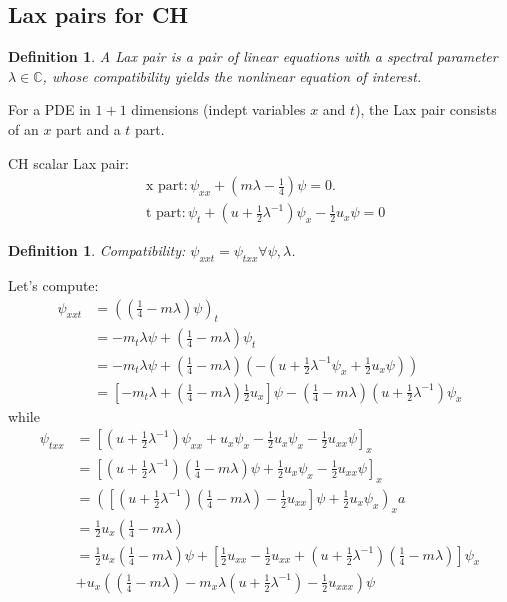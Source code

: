 \documentclass[12pt,reqno]{amsart}
\numberwithin{equation}{section}  %
\newcommand{\cc}{\mathbb{C}}
\newtheorem{definition}[theorem]{Definition}
\begin{document}
\subsection{Lax pairs for CH} 
\label{ssec:lax-pair-CH}
\begin{definition}
    A Lax pair is a pair of linear equations with a spectral parameter $\lambda \in
    \cc$, whose compatibility yields the nonlinear equation of interest. 
\end{definition}
For a PDE in $1+1$ dimensions (indept variables $x$ and $t$), the Lax pair
consists of an $x$ part and a $t$ part.

CH scalar Lax pair:
%
%
\begin{equation*}
    \begin{split}
	& \text{x part}: \psi_{xx} + (m \lambda - \frac{1}{4}) \psi = 0.
	\\
	& \text{t part}: \psi_{t} + (u + \frac{1}{2} \lambda^{-1})\psi_{x} -
	\frac{1}{2}u_{x} \psi = 0
    \end{split}
\end{equation*}
%
%
\begin{definition}
    Compatibility: $\psi_{xxt} = \psi_{txx} \forall \psi, \lambda$. 
\end{definition}
Let's compute:
%
%
\begin{equation*}
    \begin{split}
	\psi_{xxt}
	& = \left( (\frac{1}{4} - m \lambda)\psi \right)_{t}
	\\
	& = -m_{t} \lambda \psi + \left( \frac{1}{4} - m \lambda \right)
	\psi_{t}
	\\
	& = -m_{t} \lambda \psi + \left( \frac{1}{4} - m \lambda \right)\left(
	    -(u + \frac{1}{2} \lambda^{-1}\psi_{x} + \frac{1}{2} u_{x} \psi)
	\right)
	\\
	& = \left[ -m_{t} \lambda + (\frac{1}{4}- m \lambda)\frac{1}{2}u_{x} \right]\psi
	- (\frac{1}{4} - m \lambda)(u + \frac{1}{2}\lambda^{-1})\psi_{x}
    \end{split}
\end{equation*}
%
%
while
%
%
\begin{equation*}
    \begin{split}
	\psi_{txx}
	& = \left[ (u + \frac{1}{2} \lambda^{-1})\psi_{xx} + u_{x}
	    \psi_{x} - \frac{1}{2} u_{x} \psi_{x} - \frac{1}{2} u_{xx} \psi
	\right]_{x}
	\\
	& = \left[ (u + \frac{1}{2}\lambda^{-1})(\frac{1}{4} - m \lambda)\psi
	    + \frac{1}{2} u_{x} \psi_{x} - \frac{1}{2} u_{xx} \psi \right]_{x}
	\\
	& = \left( \left[ (u + \frac{1}{2} \lambda^{-1})(\frac{1}{4} - m \lambda) -
		\frac{1}{2} u_{xx} \right]\psi + \frac{1}{2} u_{x} \psi_{x} \right)_{x}a
	\\
	& = \frac{1}{2} u_{x}(\frac{1}{4} - m \lambda)
	\\
	& = \frac{1}{2}u_{x}\left( \frac{1}{4} - m \lambda \right)\psi + \left[
	    \frac{1}{2}u_{xx} - \frac{1}{2} u_{xx} + (u +
	    \frac{1}{2}\lambda^{-1})(\frac{1}{4} - m \lambda)
	\right]\psi_{x}
	\\
	& + u_{x}\left( (\frac{1}{4} - m \lambda) - m_{x} \lambda (u +
	    \frac{1}{2} \lambda^{-1}) - \frac{1}{2} u_{xxx}\right)\psi
    \end{split}
\end{equation*}
\end{document}
